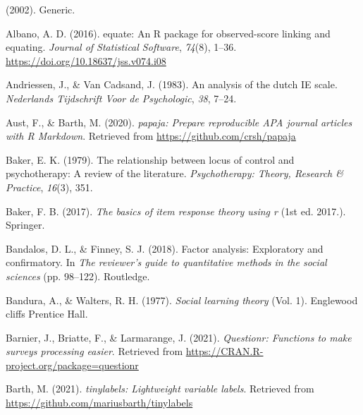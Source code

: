 \documentclass[
  english,
  man]{apa6}
\newlength{\cslhangindent}
\newlength{\cslentryspacingunit} %
\newenvironment{CSLReferences}[2] %
 {%
  \setlength{\parindent}{0pt}
  \ifodd #1
  \let\oldpar\par
  \def\par{\hangindent=\cslhangindent\oldpar}
  \fi
  \setlength{\parskip}{#2\cslentryspacingunit}
 }%
 {}
\begin{document}
\begingroup
\setlength{\parindent}{-0.5in}
\setlength{\leftskip}{0.5in}

\hypertarget{refs}{}
\begin{CSLReferences}{1}{0}
\leavevmode{}%
(2002). Generic.

\leavevmode{}%
Albano, A. D. (2016). {equate}: An {R} package for observed-score linking and equating. \emph{Journal of Statistical Software}, \emph{74}(8), 1--36. \url{https://doi.org/10.18637/jss.v074.i08}

\leavevmode{}%
Andriessen, J., \& Van Cadsand, J. (1983). An analysis of the dutch IE scale. \emph{Nederlands Tijdschrift Voor de Psychologic}, \emph{38}, 7--24.

\leavevmode{}%
Aust, F., \& Barth, M. (2020). \emph{{papaja}: {Prepare} reproducible {APA} journal articles with {R Markdown}}. Retrieved from \url{https://github.com/crsh/papaja}

\leavevmode{}%
Baker, E. K. (1979). The relationship between locus of control and psychotherapy: A review of the literature. \emph{Psychotherapy: Theory, Research \& Practice}, \emph{16}(3), 351.

\leavevmode{}%
Baker, F. B. (2017). \emph{The basics of item response theory using r} (1st ed. 2017.). Springer.

\leavevmode{}%
Bandalos, D. L., \& Finney, S. J. (2018). Factor analysis: Exploratory and confirmatory. In \emph{The reviewer's guide to quantitative methods in the social sciences} (pp. 98--122). Routledge.

\leavevmode{}%
Bandura, A., \& Walters, R. H. (1977). \emph{Social learning theory} (Vol. 1). Englewood cliffs Prentice Hall.

\leavevmode{}%
Barnier, J., Briatte, F., \& Larmarange, J. (2021). \emph{Questionr: Functions to make surveys processing easier}. Retrieved from \url{https://CRAN.R-project.org/package=questionr}

\leavevmode{}%
Barth, M. (2021). \emph{{tinylabels}: Lightweight variable labels}. Retrieved from \url{https://github.com/mariusbarth/tinylabels}


\end{CSLReferences}
\end{document}
